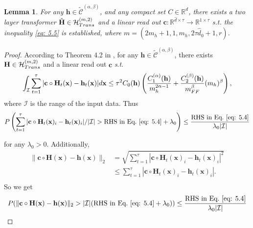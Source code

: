 \documentclass{article}
\theoremstyle{plain}
\newtheorem{lemma}[theorem]{Lemma}
\theoremstyle{definition}
\theoremstyle{remark}
\begin{document}
\begin{lemma}
    For any $\mathbf{h}\in \widetilde{\mathcal{C}}^{(\alpha, \beta)}$, and any compact set $C\in \mathbb{R}^d$, there exists a two layer transformer $\hat{\mathbf{H}} \in \mathcal{H}_{\rm Trans}^{(m,2)}$ and a linear read out $\mathbf{c}:\mathbb{R}^{\hat{d}\times \tau}\xrightarrow{}\mathbb{R}^{1\times \tau}$ \textit{s}.\textit{t}. the inequality \eqref{eq: 5.5} is established,
    where $m=(2m_h+1,1,m_h,2\tau \hat{d}_0+1,r)$.
    \label{Jackson lemma1}
\end{lemma}
\begin{proof}
    According to Theorem 4.2 in \citet{jiang2023approximation}, for any $\mathbf{h}\in \widetilde{\mathcal{C}}^{(\alpha, \beta)}$, there exists $\mathbf{H} \in \mathcal{H}_{\rm Trans}^{(m,2)}$ and a linear read out $\mathbf{c}$ \textit{s}.\textit{t}. 
    \begin{equation}        \int_{\mathcal{I}}\sum_{t=1}^{\tau}|\mathbf{c}\circ\mathbf{H}_t(\mathbf{x})-\mathbf{h}_t(\mathbf{x})|d\mathbf{x}
        \leq \tau^2 C_0(\mathbf{h} )
        \left(\frac{C_1^{(\alpha)}(\mathbf{h} )}{m_h^{2\alpha-1}}+\frac{C_2^{(\beta )}(\mathbf{h})}{m_{\rm FF}^{\beta}}(m_h)^{\beta}\right),
        \label{eq: 5.4}
    \end{equation}
    where $\mathcal{I}$ is the range of the input data. Thus
    \begin{equation}   P\left(\sum_{t=1}^{\tau}|\mathbf{c}\circ\mathbf{H}_t(\mathbf{x})_i-\mathbf{h}_t(\mathbf{x})_i|/|\mathcal{I}|>\text{RHS~in~Eq.}~\eqref{eq: 5.4}+\lambda_0\right)\leq\frac{\text{RHS~in~Eq.}~\eqref{eq: 5.4}}{\lambda_0|\mathcal{I}|}
    \end{equation}
    
    for any $\lambda_0>0$. Additionally,
    \begin{equation}
        \begin{aligned}
            \bigl\|\mathbf{c}\circ\mathbf{H}(\mathbf{x})-\mathbf{h}(\mathbf{x})\bigr\|_2         &=\sqrt{\sum_{t=1}^{\tau}|\mathbf{c}\circ\mathbf{H}_{t}(\mathbf{x})_i-\mathbf{h}_{t}(\mathbf{x})_i|^2} \\
            &\leq \sum_{t=1}^{\tau}|\mathbf{c}\circ\mathbf{H}_{t}(\mathbf{x})_i-\mathbf{h}_{t}(\mathbf{x})_i|. \\
        \end{aligned} 
    \label{eq: 22}
    \end{equation}
    So we get 
    \begin{equation}   
    P(\|\mathbf{c}\circ\mathbf{H}(\mathbf{x})-\mathbf{h}(\mathbf{x})\|_2>|\mathcal{I}|(\text{RHS~in~Eq.}~\eqref{eq: 5.4}+\lambda_0))\leq\frac{\text{RHS~in~Eq.}~\eqref{eq: 5.4}}{\lambda_0|\mathcal{I}|}
    \label{eq: 5.5}
    \end{equation}
    

\end{proof}
\end{document}
